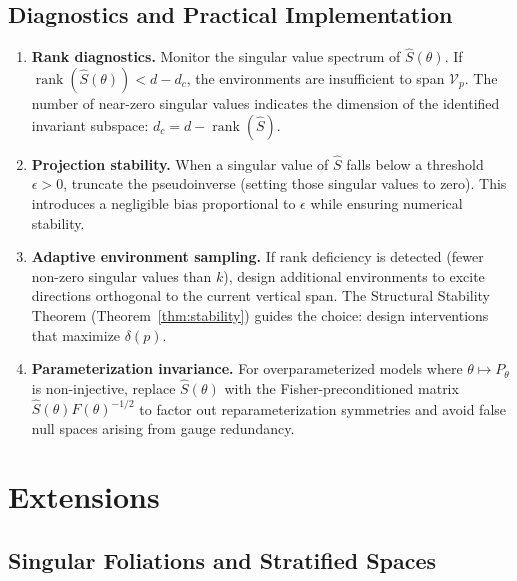 \documentclass[11pt,a4paper]{article}
\DeclareMathOperator{\rank}{rank}
\newcommand{\cV}{\mathcal{V}}
\begin{document}
\subsection{Diagnostics and Practical Implementation}

\begin{enumerate}[leftmargin=2em]
\item \textbf{Rank diagnostics.} Monitor the singular value spectrum of $\hat S(\theta)$. If $\rank(\hat S(\theta)) < d - d_c$, the environments are insufficient to span $\cV_p$. The number of near-zero singular values indicates the dimension of the identified invariant subspace: $d_c = d - \rank(\hat S)$.

\item \textbf{Projection stability.} When a singular value of $\hat S$ falls below a threshold $\epsilon > 0$, truncate the pseudoinverse (setting those singular values to zero). This introduces a negligible bias proportional to $\epsilon$ while ensuring numerical stability.

\item \textbf{Adaptive environment sampling.} If rank deficiency is detected (fewer non-zero singular values than $k$), design additional environments to excite directions orthogonal to the current vertical span. The Structural Stability Theorem (Theorem~\ref{thm:stability}) guides the choice: design interventions that maximize $\delta(p)$.

\item \textbf{Parameterization invariance.} For overparameterized models where $\theta \mapsto P_\theta$ is non-injective, replace $\hat S(\theta)$ with the Fisher-preconditioned matrix $\hat S(\theta) F(\theta)^{-1/2}$ to factor out reparameterization symmetries and avoid false null spaces arising from gauge redundancy.
\end{enumerate}

\section{Extensions}
\label{sec:extensions}

\subsection{Singular Foliations and Stratified Spaces}
\end{document}
